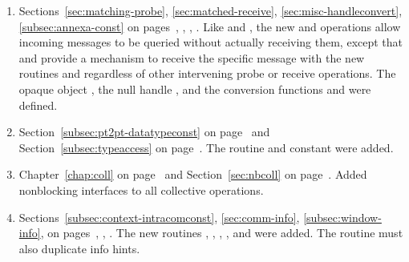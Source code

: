 \begin{enumerate}
\item 
Sections~\ref{sec:matching-probe}, 
\ref{sec:matched-receive}, 
\ref{sec:misc-handleconvert}, 
\ref{subsec:annexa-const}
on pages~\pageref{sec:matching-probe},
\pageref{sec:matched-receive},
\pageref{sec:misc-handleconvert},
\pageref{subsec:annexa-const}. 
\newline 
Like  and , the new  and  
operations allow incoming messages to be queried without actually receiving them, except that
 and  provide a mechanism to receive the specific message
with the new routines  and  regardless of other intervening probe or receive operations. 
The opaque object , the null handle , and
the conversion functions  
 and
were defined. 

\item 
Section~\ref{subsec:pt2pt-datatypeconst} on page~\pageref{subsec:pt2pt-datatypeconst} and
Section~\ref{subsec:typeaccess} on page~\pageref{subsec:typeaccess}. 
\newline 
The routine  
and constant  were added.

\item 
Chapter~\ref{chap:coll} on page~\pageref{chap:coll} and
Section~\ref{sec:nbcoll} on page~\pageref{sec:nbcoll}. 
\newline 
Added nonblocking interfaces to all collective operations.

\item 
Sections~\ref{subsec:context-intracomconst}, 
\ref{sec:comm-info}, %
\ref{subsec:window-info}, %
on pages~\pageref{subsec:context-intracomconst},
\pageref{sec:comm-info}, %
\pageref{subsec:window-info}. %
\newline 
The new routines , 
, , 
, and  were\flushline %
added.
The routine  must also duplicate 
info hints. 


\end{enumerate}
